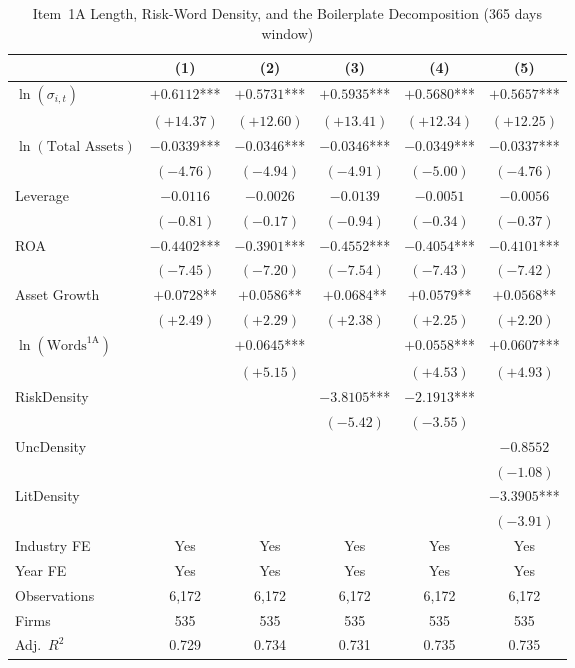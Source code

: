 \begin{table}[htbp]
\centering
\caption{Item~1A Length, Risk-Word Density, and the Boilerplate Decomposition (365 days window)}
\label{tab:main_365d}
\begin{tabular}{lccccc}
\toprule
 & (1) & (2) & (3) & (4) & (5) \\
\midrule
$\ln(\sigma_{i,t})$ & $+0.6112$*** & $+0.5731$*** & $+0.5935$*** & $+0.5680$*** & $+0.5657$*** \\
 & $(+14.37)$ & $(+12.60)$ & $(+13.41)$ & $(+12.34)$ & $(+12.25)$ \\[4pt]
$\ln(\text{Total Assets})$ & $-0.0339$*** & $-0.0346$*** & $-0.0346$*** & $-0.0349$*** & $-0.0337$*** \\
 & $(-4.76)$ & $(-4.94)$ & $(-4.91)$ & $(-5.00)$ & $(-4.76)$ \\[4pt]
Leverage & $-0.0116$ & $-0.0026$ & $-0.0139$ & $-0.0051$ & $-0.0056$ \\
 & $(-0.81)$ & $(-0.17)$ & $(-0.94)$ & $(-0.34)$ & $(-0.37)$ \\[4pt]
ROA & $-0.4402$*** & $-0.3901$*** & $-0.4552$*** & $-0.4054$*** & $-0.4101$*** \\
 & $(-7.45)$ & $(-7.20)$ & $(-7.54)$ & $(-7.43)$ & $(-7.42)$ \\[4pt]
Asset Growth & $+0.0728$** & $+0.0586$** & $+0.0684$** & $+0.0579$** & $+0.0568$** \\
 & $(+2.49)$ & $(+2.29)$ & $(+2.38)$ & $(+2.25)$ & $(+2.20)$ \\[4pt]
$\ln(\text{Words}^{\text{1A}})$ &  & $+0.0645$*** &  & $+0.0558$*** & $+0.0607$*** \\
 &  & $(+5.15)$ &  & $(+4.53)$ & $(+4.93)$ \\[4pt]
RiskDensity &  &  & $-3.8105$*** & $-2.1913$*** &  \\
 &  &  & $(-5.42)$ & $(-3.55)$ &  \\[4pt]
UncDensity &  &  &  &  & $-0.8552$ \\
 &  &  &  &  & $(-1.08)$ \\[4pt]
LitDensity &  &  &  &  & $-3.3905$*** \\
 &  &  &  &  & $(-3.91)$ \\[4pt]
\midrule
Industry FE & Yes & Yes & Yes & Yes & Yes \\
Year FE & Yes & Yes & Yes & Yes & Yes \\
Observations & 6,172 & 6,172 & 6,172 & 6,172 & 6,172 \\
Firms & 535 & 535 & 535 & 535 & 535 \\
Adj.\ $R^2$ & 0.729 & 0.734 & 0.731 & 0.735 & 0.735 \\

\end{tabular}
\end{table}
